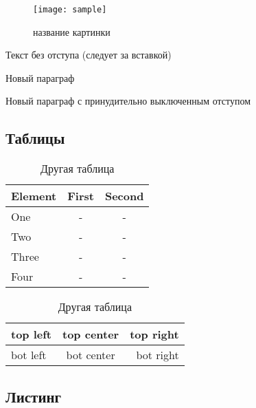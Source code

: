 \begin{figure}[H]
	\begin{center}
		\texttt{[image: sample]}
		\caption{название картинки}
		\label{pic:pic_name} %
	\end{center}
\end{figure}

Текст без отступа (следует за вставкой)

Новый параграф

\noindent Новый параграф с принудительно выключенным отступом


\subsection{Таблицы}

\begin{table}[H]
	\caption{Одна таблица}
	\begin{center}
		\begin{tabular*}{0.4\textwidth}{@{\extracolsep{\fill} } lcc}
			\toprule
			Element & First & Second \\
			\midrule
			One       & -    & -    \\
			Two       & -    & -    \\
			Three     & -    & -    \\
			Four      & -    & -    \\
			\bottomrule
		\end{tabular*}
		\label{tabular:tab_examp_1}
	\end{center}

	\caption{Другая таблица}
	\begin{center}
		\begin{tabular}{|l|c|r|}
			\hline
			top left & top center & top right \\ \hline
			bot left & bot center & bot right \\ \hline
		\end{tabular}
		\label{tabular:tab_examp_2}
	\end{center}
\end{table}

\subsection{Листинг}
\begin{code}
	
	\caption{main.c – процедурный код в массы!}
\end{code}

